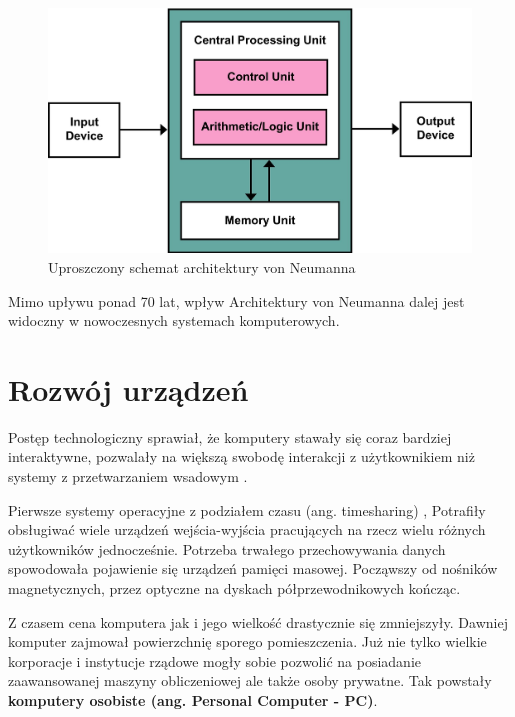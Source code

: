 \documentclass[shortabstract,inz]{iithesis}
\begin{document}
\begin{figure}
\begin{center}
\includegraphics[width=\linewidth/2]{Von_Neumann_Architecture}
\caption{Uproszczony schemat architektury von
  Neumanna \cite{image:von_neumann}}
\label{fig:von_neumann}
\end{center}
\end{figure}

Mimo upływu ponad 70 lat, wpływ Architektury von Neumanna dalej jest
widoczny w nowoczesnych systemach komputerowych.

\section{Rozwój urządzeń} %

Postęp technologiczny sprawiał, że komputery stawały się
coraz bardziej interaktywne, pozwalały na większą swobodę interakcji z
użytkownikiem niż systemy z przetwarzaniem wsadowym \cite{wiki:batch_processing}\cite{book:tanenbaum_history}.

Pierwsze systemy operacyjne z podziałem czasu (ang. timesharing) \cite{wiki:timesharing},
Potrafiły obsługiwać wiele urządzeń wejścia-wyjścia pracujących na rzecz
wielu różnych użytkowników jednocześnie.
Potrzeba trwałego przechowywania danych spowodowała pojawienie się
urządzeń pamięci masowej. Począwszy od nośników magnetycznych, przez
optyczne na dyskach półprzewodnikowych kończąc.

Z czasem cena komputera jak i jego wielkość drastycznie się zmniejszyły. Dawniej 
komputer zajmował powierzchnię sporego pomieszczenia.
Już nie tylko wielkie korporacje i instytucje rządowe mogły sobie pozwolić na 
posiadanie zaawansowanej maszyny obliczeniowej ale także osoby prywatne.
Tak powstały \textbf{komputery osobiste (ang. Personal Computer - PC)}.
\end{document}
